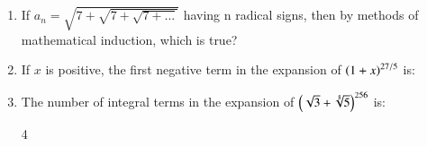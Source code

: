 \documentclass[journal,12pt,twocolumn]{IEEEtran}
\theoremstyle{remark}
\begin{document}
\begin{enumerate}
	\hfill{}
	\begin{enumerate}[label=(\alph*)]
	\end{enumerate}
\item If $a_n = \sqrt{7+\sqrt{7+\sqrt{7+...}}}$ having n radical signs, then by methods of mathematical induction, which is true?
	\hfill{}
	\begin{enumerate}[label=(\alph*)]
	\end{enumerate}
\item If $x$ is positive, the first negative term in the expansion of $\left(1+x\right)^{27/5}$ is:
	\hfill{}
	\begin{enumerate}[label=(\alph*)]
	\end{enumerate}
\item The number of integral terms in the expansion of $\left(\sqrt{3}+\sqrt[8]{5}\right)^{256}$ is:
	\hfill{}
	\begin{enumerate}[label=(\alph*)]
			{4}
	\end{enumerate}
\end{enumerate}
\end{document}
